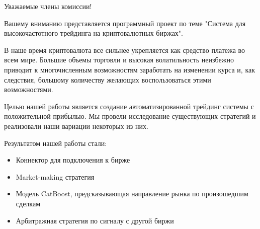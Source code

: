 Уважаемые члены комиссии!

Вашему вниманию представляется программный проект по теме "Система для высокочастотного трейдинга на криптовалютных биржах".

В наше время криптовалюта все сильнее укрепляется как средство платежа во всем мире. Большие объемы торговли и высокая волатильность неизбежно приводит к многочисленным возможностям заработать на изменении курса и, как следствия, большому количеству желающих воспользоваться этими возможностями.

Целью нашей работы является создание автоматизированной трейдинг системы с положительной прибылью. Мы провели исследование существующих стратегий и реализовали наши вариации некоторых из них.

Результатом нашей работы стали:
\begin{itemize}
    \item Коннектор для подключения к бирже
    \item Market-making стратегия
    \item Модель CatBoost, предсказывающая направление рынка по произошедшим сделкам
    \item Арбитражная стратегия по сигналу с другой биржи
\end{itemize}
